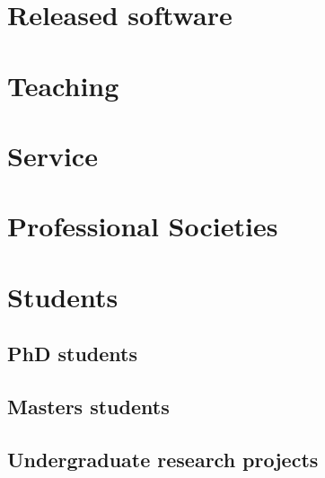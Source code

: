 \documentclass{article}
\begin{document}
\section*{Released software}



\section*{Teaching}




\section*{Service}




\section*{Professional Societies}




\section*{Students}

\subsection*{PhD students}



\subsection*{Masters students}



\subsection*{Undergraduate research projects}



\end{document}
